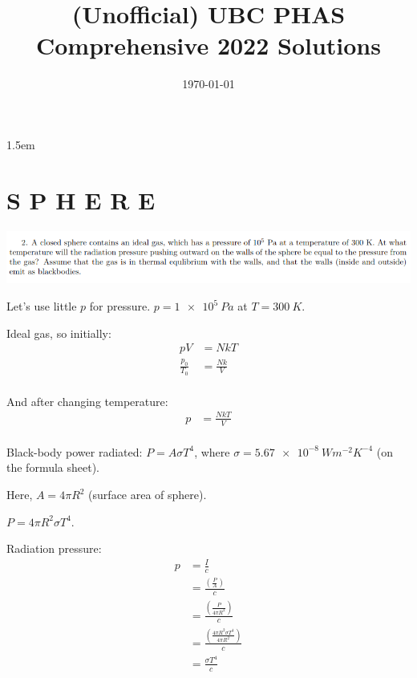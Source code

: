 \documentclass[11pt,letterpaper]{article}
\begin{document}
\thispagestyle{fancyplain}
\headheight 35pt
\author{}
\title{(Unofficial) UBC PHAS Comprehensive 2022 Solutions}
\date{\today}
\rfoot{\small\thepage}
\headsep 1.5em

\maketitle

\section*{S P H E R E}

\begin{center}
    \includegraphics[width=\textwidth]{images/Q2.png}
\end{center}


Let's use little $p$ for pressure. $p = \SI{1e5}{Pa}$ at $T = \SI{300}{K}$.

Ideal gas, so initially:
\begin{align*}
    pV &= NkT \\
    \frac{p_0}{T_0} &= \frac{Nk}{V} \\
\end{align*}

And after changing temperature:
\begin{align*}
    p &= \frac{NkT}{V} \\
\end{align*}


Black-body power radiated: $P = A \sigma T^4$, where $\sigma = \SI{5.67e-8}{W m^{-2} K^{-4}}$ (on the formula sheet).

Here, $A = 4\pi R^2$ (surface area of sphere).

$P = 4\pi R^2 \sigma T^4$.

\newpage

Radiation pressure:
\begin{align*}
    p &= \frac{I}{c} \\
    &= \frac{\left(\frac{P}{A}\right)}{c} \\
    &= \frac{\left(\frac{P}{4\pi R^2}\right)}{c} \\
    &= \frac{\left(\frac{4\pi R^2 \sigma T^4}{4\pi R^2}\right)}{c} \\
    &= \frac{\sigma T^4}{c} \\
\end{align*}
\end{document}
